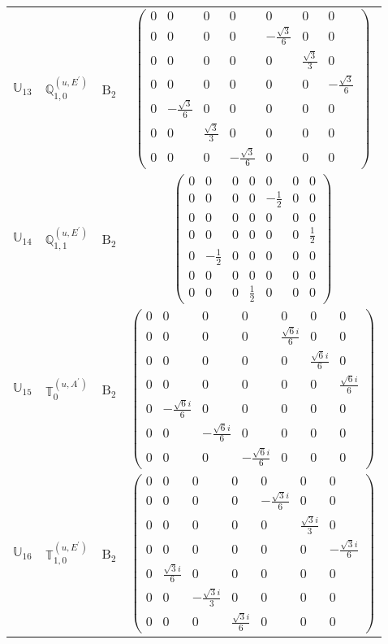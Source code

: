 \documentclass[fleqn,10pt,landscape]{article}
\begin{document}
\begin{itemize}
\begin{center}
\begin{longtable}{c|c|c|c}
$ \mathbb{U}_{13} $ & $\mathbb{Q}_{1,0}^{(u,E^{\prime})}$ & B$_{2}$ & $\begin{pmatrix} 0 & 0 & 0 & 0 & 0 & 0 & 0 \\ 0 & 0 & 0 & 0 & - \frac{\sqrt{3}}{6} & 0 & 0 \\ 0 & 0 & 0 & 0 & 0 & \frac{\sqrt{3}}{3} & 0 \\ 0 & 0 & 0 & 0 & 0 & 0 & - \frac{\sqrt{3}}{6} \\ 0 & - \frac{\sqrt{3}}{6} & 0 & 0 & 0 & 0 & 0 \\ 0 & 0 & \frac{\sqrt{3}}{3} & 0 & 0 & 0 & 0 \\ 0 & 0 & 0 & - \frac{\sqrt{3}}{6} & 0 & 0 & 0 \end{pmatrix}$ \\
$ \mathbb{U}_{14} $ & $\mathbb{Q}_{1,1}^{(u,E^{\prime})}$ & B$_{2}$ & $\begin{pmatrix} 0 & 0 & 0 & 0 & 0 & 0 & 0 \\ 0 & 0 & 0 & 0 & - \frac{1}{2} & 0 & 0 \\ 0 & 0 & 0 & 0 & 0 & 0 & 0 \\ 0 & 0 & 0 & 0 & 0 & 0 & \frac{1}{2} \\ 0 & - \frac{1}{2} & 0 & 0 & 0 & 0 & 0 \\ 0 & 0 & 0 & 0 & 0 & 0 & 0 \\ 0 & 0 & 0 & \frac{1}{2} & 0 & 0 & 0 \end{pmatrix}$ \\
$ \mathbb{U}_{15} $ & $\mathbb{T}_{0}^{(u,A^{\prime})}$ & B$_{2}$ & $\begin{pmatrix} 0 & 0 & 0 & 0 & 0 & 0 & 0 \\ 0 & 0 & 0 & 0 & \frac{\sqrt{6} i}{6} & 0 & 0 \\ 0 & 0 & 0 & 0 & 0 & \frac{\sqrt{6} i}{6} & 0 \\ 0 & 0 & 0 & 0 & 0 & 0 & \frac{\sqrt{6} i}{6} \\ 0 & - \frac{\sqrt{6} i}{6} & 0 & 0 & 0 & 0 & 0 \\ 0 & 0 & - \frac{\sqrt{6} i}{6} & 0 & 0 & 0 & 0 \\ 0 & 0 & 0 & - \frac{\sqrt{6} i}{6} & 0 & 0 & 0 \end{pmatrix}$ \\
$ \mathbb{U}_{16} $ & $\mathbb{T}_{1,0}^{(u,E^{\prime})}$ & B$_{2}$ & $\begin{pmatrix} 0 & 0 & 0 & 0 & 0 & 0 & 0 \\ 0 & 0 & 0 & 0 & - \frac{\sqrt{3} i}{6} & 0 & 0 \\ 0 & 0 & 0 & 0 & 0 & \frac{\sqrt{3} i}{3} & 0 \\ 0 & 0 & 0 & 0 & 0 & 0 & - \frac{\sqrt{3} i}{6} \\ 0 & \frac{\sqrt{3} i}{6} & 0 & 0 & 0 & 0 & 0 \\ 0 & 0 & - \frac{\sqrt{3} i}{3} & 0 & 0 & 0 & 0 \\ 0 & 0 & 0 & \frac{\sqrt{3} i}{6} & 0 & 0 & 0 \end{pmatrix}$ \\

\end{longtable}
\end{center}
\end{itemize}
\end{document}
